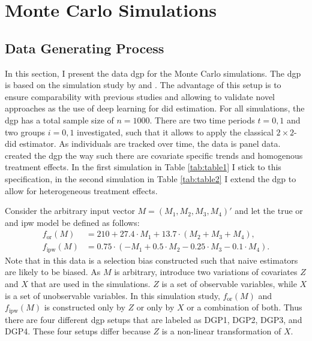 \section{Monte Carlo Simulations}


\subsection{Data Generating Process}

In this section, I present the data \ac{dgp} for the Monte Carlo simulations.
The \ac{dgp} is based on the simulation study by \citet{kang2007demystifying} and \citet{santannaDoublyRobustDifferenceindifferences2020}.
The advantage of this setup is to ensure comparability with previous studies and allowing to validate novel approaches as the use of deep learning for \ac{did} estimation.
For all simulations, the \ac{dgp} has a total sample size of $n=1000$.
There are two time periods $t=0,1$ and two groups $i=0,1$ investigated, such that it allows to apply the classical $2\times2$-\ac{did} estimator.
As individuals are tracked over time, the data is panel data.
\citet{kang2007demystifying} created the \ac{dgp} the way such there are covariate specific trends and homogenous treatment effects.
In the first simulation in Table \ref{tab:table1} I stick to this specification, in the second simulation in Table \ref{tab:table2} I extend the \ac{dgp} to allow for heterogeneous treatment effects.

Consider the arbitrary input vector $M = (M_1, M_2, M_3, M_4)'$ and let the true \ac{or} and \ac{ipw} model be defined as follows:
\begin{align}
    f_{\text{or}}(M) &= 210 + 27.4 \cdot M_1 + 13.7 \cdot (M_2 + M_3 + M_4), \\
    f_{\text{ipw}}(M) &= 0.75 \cdot (-M_1 + 0.5 \cdot M_2 - 0.25 \cdot M_3 - 0.1 \cdot M_4).
\end{align}
Note that in this data is a selection bias constructed \citep{kang2007demystifying} such that naive estimators are likely to be biased.
As $M$ is arbitrary, \citet{kang2007demystifying} introduce two variations of covariates $Z$ and $X$ that are used in the simulations.
$Z$ is a set of observable variables, while $X$ is a set of unobservable variables.
In this simulation study, $f_{\text{or}}(M)$ and $f_{\text{ipw}}(M)$ is constructed only by $Z$ or only by $X$ or a combination of both.
Thus there are four different \ac{dgp} setups that are labeled as DGP1, DGP2, DGP3, and DGP4.
These four setups differ because $Z$ is a non-linear transformation of $X$.

